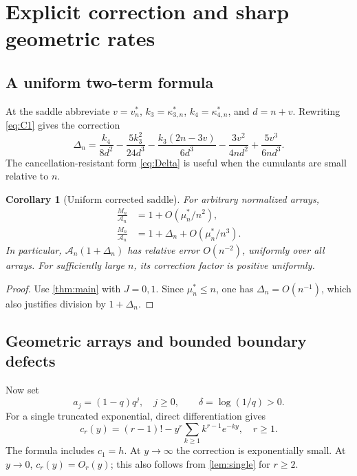 \documentclass[11pt,a4paper]{article}
\numberwithin{equation}{section}
\newtheorem{corollary}[theorem]{Corollary}
\theoremstyle{definition}\newtheorem{definition}[theorem]{Definition}
\theoremstyle{remark}\newtheorem{remark}[theorem]{Remark}
\newcommand{\A}{\mathcal A}
\begin{document}
\section{Explicit correction and sharp geometric rates}
\label{sec:geometric}
\subsection{A uniform two-term formula}
At the saddle abbreviate $v=v_n^*$, $k_3=\kappa_{3,n}^*$, $k_4=\kappa_{4,n}^*$, and $d=n+v$. Rewriting \eqref{eq:C1} gives the correction
\begin{equation}\label{eq:Delta}
 \boxed{\displaystyle
 \Delta_n=\frac{k_4}{8d^2}-\frac{5k_3^2}{24d^3}
 -\frac{k_3(2n-3v)}{6d^3}
 -\frac{3v^2}{4nd^2}+\frac{5v^3}{6nd^3}.}
\end{equation}
The cancellation-resistant form \eqref{eq:Delta} is useful when the cumulants are small relative to $n$.

\begin{corollary}[Uniform corrected saddle]\label{cor:uniform}
For arbitrary normalized arrays,
\begin{align}
 \frac{M_n}{\A_n}&=1+O(\mu_n^*/n^2),\label{eq:uncorrected}\\
 \frac{M_n}{\A_n}&=1+\Delta_n+O(\mu_n^*/n^3).
 \label{eq:corrected}
\end{align}
In particular, $\A_n(1+\Delta_n)$ has relative error $O(n^{-2})$, uniformly over all arrays. For sufficiently large $n$, its correction factor is positive uniformly.
\end{corollary}
\begin{proof}
Use \cref{thm:main} with $J=0,1$. Since $\mu_n^*\le n$, one has $\Delta_n=O(n^{-1})$, which also justifies division by $1+\Delta_n$.
\end{proof}

\subsection{Geometric arrays and bounded boundary defects}
Now set
\begin{equation}\label{eq:geometric}
 a_j=(1-q)q^j,\quad j\ge0,\qquad \delta=\log(1/q)>0.
\end{equation}
For a single truncated exponential, direct differentiation gives
\begin{equation}\label{eq:singlecumulant}
 c_r(y)=(r-1)!-y^r\sum_{k\ge1}k^{r-1}e^{-ky},\quad r\ge1.
\end{equation}
The formula includes $c_1=h$. At $y\to\infty$ the correction is exponentially small. At $y\to0$, $c_r(y)=O_r(y)$; this also follows from \cref{lem:single} for $r\ge2$.
\end{document}
